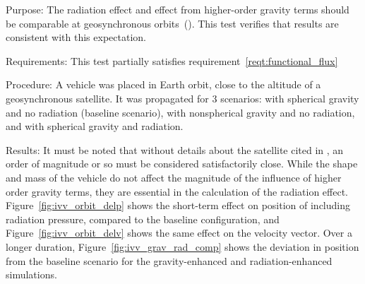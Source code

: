   \label{test:non_sph_grav}
  \begin{description}
  \item{Purpose:}\newline
    The radiation effect and effect from higher-order gravity terms
    should be comparable at geosynchronous orbits~(\cite{radbib:Milani}).
    This test verifies that results are consistent with this
    expectation.
  \item{Requirements:}\newline
    This test partially satisfies
    requirement~\ref{reqt:functional_flux}
  \item{Procedure:}\newline
     A vehicle was placed in Earth orbit, close to the altitude of a
     geosynchronous satellite.  It was propagated for 3 scenarios:
     with spherical gravity and no radiation (baseline scenario),
     with nonspherical gravity and no radiation, and with spherical
     gravity and radiation.
  \item{Results:}\newline
     It must be noted that without details about the satellite cited in
     \cite{radbib:Milani}, an order of magnitude or so must be considered
     satisfactorily close.  While the shape and mass of the vehicle do not
     affect the magnitude of the influence of higher order gravity terms,
     they are
     essential in the calculation of the radiation effect.
     Figure~\ref{fig:ivv_orbit_delp} shows the short-term effect on position of including radiation pressure, compared to the baseline configuration, and Figure~\ref{fig:ivv_orbit_delv} shows the same effect on the velocity vector.  Over a longer duration, Figure~\ref{fig:ivv_grav_rad_comp} shows the deviation in position
     from the baseline scenario for the gravity-enhanced and
     radiation-enhanced simulations.


\end{description}
